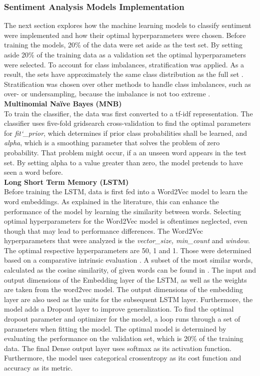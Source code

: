 \documentclass[11pt, a4paper]{article}
\begin{document}
\subsubsection{Sentiment Analysis Models Implementation}
The next section explores how the machine learning models to classify sentiment were implemented and how their optimal hyperparameters were chosen.
Before training the models, 20\% of the data were set aside as the test set. By setting aside 20\% of the training data as a validation set 
the optimal hyperparameters were selected. To account for class imbalances, stratification was applied. As a result, the sets have approximately the same
class distribution as the full set \citep{sahu2017stratification}.
Stratification was chosen over other methods to handle class imbalances, such as over- or undersampling, because the imbalance
is not too extreme \citep{ganganwar2012overview}.\\

\noindent\textbf{Multinomial Naïve Bayes (MNB)}\\
To train the classifier, the data was first converted to a tf-idf representation.
The classifier uses five-fold gridsearch cross-validation to find the optimal parameters for
\emph{fit\char`_prior}, which determines if prior class probabilities shall be learned, and \emph{alpha}, which is a smoothing parameter that solves
the problem of zero probability. That problem might occur, if a an unseen word appears in the test set. By setting alpha to a value greater than
zero, the model pretends to have seen a word before.\\

\noindent\textbf{Long Short Term Memory (LSTM)}\\
Before training the LSTM, data is first fed into a Word2Vec model to learn the word embeddings. As explained in the literature, this can enhance the performance of the model by learning the similarity between words.
Selecting optimal hyperparameters for the Word2Vec model is oftentimes neglected, even though that may lead to performance differences.
The Word2Vec hyperparameters that were analyzed is the \emph{vector\_size, min\_count} and \emph{window}. The optimal respective hyperparameters are 50, 1 and 1. Those were determined based on a comparative intrinsic evaluation \citep{schnabel2015embeddings}.
A subset of the most similar words, calculated as the cosine similarity, of given words can be found in .
The input and output dimensions of the Embedding layer of the LSTM, as well as the weights are taken from the word2vec model.
The output dimensions of the embedding layer are also used as the units for the subsequent LSTM layer. Furthermore, the model adds a Dropout layer to improve generalization. To find the optimal dropout parameter and optimizer for the model,
a loop runs through a set of parameters when fitting the model. The optimal model is determined by evaluating the performance on the validation set, which is 20\% of the training data. 
The final Dense output layer uses softmax as its activation function. Furthermore, the model uses categorical crossentropy as its cost function and accuracy as its metric.\\
\end{document}
